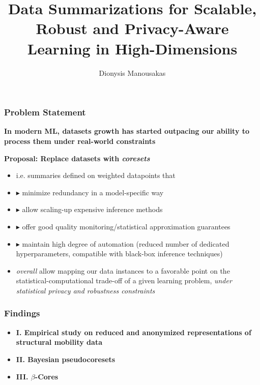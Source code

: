 \documentclass[hyperref={colorlinks = true},unknownkeysallowed]{beamer}
\title{Data Summarizations for Scalable, Robust and Privacy-Aware Learning in High-Dimensions}
\author{Dionysis Manousakas}
\institute{Department of Computer Science \& Technology, \\University of Cambridge}
\date{}
\begin{document}
	
\begin{frame}
\vspace{2cm}
  \titlepage
  \vspace{10cm}
\end{frame}

\begin{frame}
\frametitle{Problem Statement}
\begin{tcolorbox}[colback=green!5,colframe=white!40!black]  
		\centering
\textbf{In modern ML, datasets growth has started outpacing our ability to process them under real-world constraints}\\
\end{tcolorbox}
\textbf{Proposal: Replace datasets with \emph{coresets}}
\begin{itemize}
	\item i.e. summaries defined on weighted datapoints 
	\pause that
	\item $\blacktriangleright$ minimize redundancy in a model-specific way
	\item $\blacktriangleright$ allow scaling-up expensive inference methods
	\item $\blacktriangleright$ offer good quality monitoring/statistical approximation guarantees
	\item  $\blacktriangleright$ maintain high degree of automation (reduced number of dedicated hyperparameters, compatible with black-box inference techniques)
	\pause
	\item \emph{overall} allow mapping our data instances to a favorable point on the statistical-computational trade-off of a given learning problem, \emph{under statistical privacy and robustness constraints}
\end{itemize}
\end{frame}

\begin{frame}
	\frametitle{Findings}
	\begin{itemize}
		\item \textbf{I. Empirical study on reduced and anonymized representations of structural mobility data} 
		\item \textbf{II. Bayesian pseudocoresets}
		\item \textbf{III. $\beta$-Cores}
	\end{itemize}
\end{frame}
\end{document}
